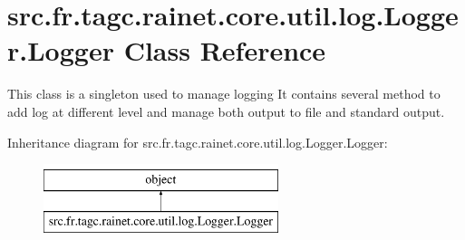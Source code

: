\hypertarget{classsrc_1_1fr_1_1tagc_1_1rainet_1_1core_1_1util_1_1log_1_1Logger_1_1Logger}{}\section{src.\+fr.\+tagc.\+rainet.\+core.\+util.\+log.\+Logger.\+Logger Class Reference}
\label{classsrc_1_1fr_1_1tagc_1_1rainet_1_1core_1_1util_1_1log_1_1Logger_1_1Logger}


This class is a singleton used to manage logging It contains several method to add log at different level and manage both output to file and standard output.  


Inheritance diagram for src.\+fr.\+tagc.\+rainet.\+core.\+util.\+log.\+Logger.\+Logger\+:\begin{figure}[H]
\begin{center}
\leavevmode
\includegraphics[height=2.000000cm]{classsrc_1_1fr_1_1tagc_1_1rainet_1_1core_1_1util_1_1log_1_1Logger_1_1Logger}
\end{center}
\end{figure}
